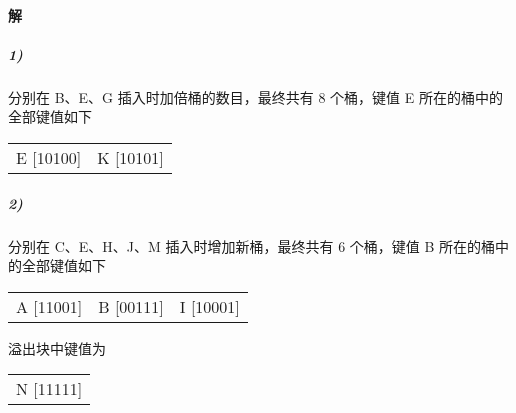 \documentclass{article}
\begin{document}
\paragraph{解}
\subparagraph{1)} 分别在 B、E、G 插入时加倍桶的数目，最终共有 8 个桶，键值 E 所在的桶中的全部键值如下
\begin{table}[H]
    \centering
    \begin{tabular}{cc}
        E [10100] & K [10101]
    \end{tabular}
\end{table}

\subparagraph{2)} 分别在 C、E、H、J、M 插入时增加新桶，最终共有 6 个桶，键值 B 所在的桶中的全部键值如下
\begin{table}[H]
    \centering
    \begin{tabular}{ccc}
        A [11001] & B [00111] & I [10001]
    \end{tabular}
\end{table}
溢出块中键值为
\begin{table}[H]
    \centering
    \begin{tabular}{c}
        N [11111]
    \end{tabular}
\end{table}
\end{document}
